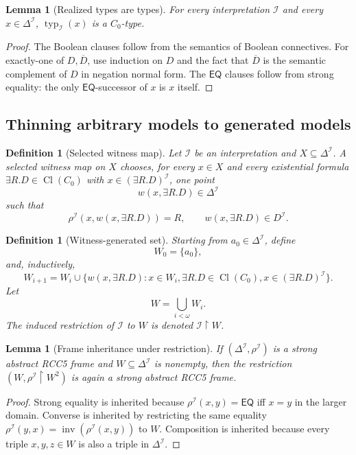 \documentclass[11pt]{article}
\newtheorem{lemma}[theorem]{Lemma}
\newtheorem{definition}[theorem]{Definition}
\newcommand{\EQ}{\mathsf{EQ}}
\newcommand{\Inv}{\operatorname{inv}}
\newcommand{\Cl}{\operatorname{Cl}}
\newcommand{\I}{\mathcal I}
\newcommand{\typ}{\operatorname{typ}}
\begin{document}
\begin{lemma}[Realized types are types]\label{lem:realized-type}
For every interpretation $\I$ and every $x\in\Delta^\I$, $\typ_\I(x)$ is a $C_0$-type.
\end{lemma}

\begin{proof}
The Boolean clauses follow from the semantics of Boolean connectives.  For exactly-one of $D,\overline D$, use induction on $D$ and the fact that $\overline D$ is the semantic complement of $D$ in negation normal form.  The $\EQ$ clauses follow from strong equality: the only $\EQ$-successor of $x$ is $x$ itself.
\end{proof}

\subsection{Thinning arbitrary models to generated models}

\begin{definition}[Selected witness map]\label{def:witness-map}
Let $\I$ be an interpretation and $X\subseteq\Delta^\I$.  A selected witness map on $X$ chooses, for every $x\in X$ and every existential formula $\exists R.D\in\Cl(C_0)$ with $x\in(\exists R.D)^\I$, one point
\[
   w(x,\exists R.D)\in\Delta^\I
\]
such that
\[
   \rho^\I(x,w(x,\exists R.D))=R,
   \qquad
   w(x,\exists R.D)\in D^\I.
\]
\end{definition}

\begin{definition}[Witness-generated set]\label{def:witness-generated}
Starting from $a_0\in\Delta^\I$, define
\[
  W_0=\{a_0\},
\]
and, inductively,
\[
  W_{i+1}=W_i\cup\{w(x,\exists R.D):x\in W_i,
         \exists R.D\in\Cl(C_0),
         x\in(\exists R.D)^\I\}.
\]
Let
\[
  W=\bigcup_{i<\omega}W_i.
\]
The induced restriction of $\I$ to $W$ is denoted $\I\upharpoonright W$.
\end{definition}

\begin{lemma}[Frame inheritance under restriction]\label{lem:restriction-frame}
If $(\Delta^\I,\rho^\I)$ is a strong abstract RCC5 frame and $W\subseteq\Delta^\I$ is nonempty, then the restriction $(W,\rho^\I\upharpoonright W^2)$ is again a strong abstract RCC5 frame.
\end{lemma}

\begin{proof}
Strong equality is inherited because $\rho^\I(x,y)=\EQ$ iff $x=y$ in the larger domain.  Converse is inherited by restricting the same equality $\rho^\I(y,x)=\Inv(\rho^\I(x,y))$ to $W$.  Composition is inherited because every triple $x,y,z\in W$ is also a triple in $\Delta^\I$.
\end{proof}
\end{document}
